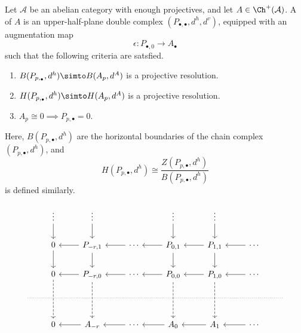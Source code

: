 \documentclass[main.tex]{subfiles}
\begin{document}
\begin{definition}
  \label{def:cartan_eilenberg_resolution}
  Let $\mathcal{A}$ be an abelian category with enough projectives, and let $A \in \Ch^{+}(\mathcal{A})$. A  of $A$ is an upper-half-plane double complex $(P_{\bullet,\bullet}, d^{h}, d^{v})$, equipped with an augmentation map
  \begin{equation*}
    \epsilon\colon P_{\bullet, 0} \to A_{\bullet}
  \end{equation*}
  such that the following criteria are satsfied.
  \begin{enumerate}
    \item $B(P_{p,_{\bullet}}, d^{h}) \simto B(A_{p}, d^{A})$ is a projective resolution.

    \item $H(P_{p,_{\bullet}}, d^{h}) \simto H(A_{p}, d^{A})$ is a projective resolution.

    \item $A_{p} \cong 0 \implies P_{p,\bullet} = 0$.
  \end{enumerate}
\end{definition}
Here, $B(P_{p,\bullet}, d^{h})$ are the horizontal boundaries of the chain complex $(P_{p,\bullet}, d^{h})$, and
\begin{equation*}
  H(P_{p,\bullet}, d^{h}) \cong \frac{Z(P_{p,\bullet}, d^{h})}{B(P_{p,\bullet}, d^{h})}
\end{equation*}
is defined similarly.

\begin{equation*}
  \begin{tikzcd}
    & \vdots
    \arrow[d]
    & \vdots
    \arrow[d]
    && \vdots
    \arrow[d]
    & \vdots
    \arrow[d]
    \\
    & 0
    \arrow[r, leftarrow]
    \arrow[d]
    & P_{-r,1}
    \arrow[r, leftarrow]
    \arrow[d]
    & \cdots
    \arrow[r, leftarrow]
    & P_{0,1}
    \arrow[r, leftarrow]
    \arrow[d]
    & P_{1,1}
    \arrow[r, leftarrow]
    \arrow[d]
    & \cdots
    \\
    & 0
    \arrow[r, leftarrow]
    \arrow[dd, dashed]
    & P_{-r,0}
    \arrow[r, leftarrow]
    \arrow[dd, dashed]
    & \cdots
    \arrow[r, leftarrow]
    & P_{0,0}
    \arrow[r, leftarrow]
    \arrow[dd, dashed]
    & P_{1,0}
    \arrow[r, leftarrow]
    \arrow[dd, dashed]
    & \cdots
    \\
    \
    \arrow[rrrrrrr, dotted, no head]
    &&&&&&& \
    \\
    & 0
    \arrow[r, leftarrow]
    & A_{-r}
    \arrow[r, leftarrow]
    & \cdots
    \arrow[r, leftarrow]
    & A_{0}
    \arrow[r, leftarrow]
    & A_{1}
    \arrow[r, leftarrow]
    & \cdots
  \end{tikzcd}
\end{equation*}
\end{document}
